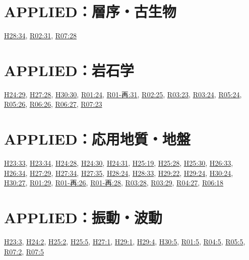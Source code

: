 \section{APPLIED：層序・古生物}
\hyperref[q:h28-reg-applied-34]{H28:34}, \hyperref[q:r02-reg-applied-31]{R02:31}, \hyperref[q:r07-reg-applied-28]{R07:28}
\section{APPLIED：岩石学}
\hyperref[q:h24-reg-applied-29]{H24:29}, \hyperref[q:h27-reg-applied-28]{H27:28}, \hyperref[q:h30-reg-applied-30]{H30:30}, \hyperref[q:r01-reg-applied-24]{R01:24}, \hyperref[q:r01-ret-applied-31]{R01-再:31}, \hyperref[q:r02-reg-applied-25]{R02:25}, \hyperref[q:r03-reg-applied-23]{R03:23}, \hyperref[q:r03-reg-applied-24]{R03:24}, \hyperref[q:r05-reg-applied-24]{R05:24}, \hyperref[q:r05-reg-applied-26]{R05:26}, \hyperref[q:r06-reg-applied-26]{R06:26}, \hyperref[q:r06-reg-applied-27]{R06:27}, \hyperref[q:r07-reg-applied-23]{R07:23}
\section{APPLIED：応用地質・地盤}
\hyperref[q:h23-reg-applied-33]{H23:33}, \hyperref[q:h23-reg-applied-34]{H23:34}, \hyperref[q:h24-reg-applied-28]{H24:28}, \hyperref[q:h24-reg-applied-30]{H24:30}, \hyperref[q:h24-reg-applied-31]{H24:31}, \hyperref[q:h25-reg-applied-19]{H25:19}, \hyperref[q:h25-reg-applied-28]{H25:28}, \hyperref[q:h25-reg-applied-30]{H25:30}, \hyperref[q:h26-reg-applied-33]{H26:33}, \hyperref[q:h26-reg-applied-34]{H26:34}, \hyperref[q:h27-reg-applied-29]{H27:29}, \hyperref[q:h27-reg-applied-34]{H27:34}, \hyperref[q:h27-reg-applied-35]{H27:35}, \hyperref[q:h28-reg-applied-24]{H28:24}, \hyperref[q:h28-reg-applied-33]{H28:33}, \hyperref[q:h29-reg-applied-22]{H29:22}, \hyperref[q:h29-reg-applied-24]{H29:24}, \hyperref[q:h30-reg-applied-24]{H30:24}, \hyperref[q:h30-reg-applied-27]{H30:27}, \hyperref[q:r01-reg-applied-29]{R01:29}, \hyperref[q:r01-ret-applied-26]{R01-再:26}, \hyperref[q:r01-ret-applied-28]{R01-再:28}, \hyperref[q:r03-reg-applied-28]{R03:28}, \hyperref[q:r03-reg-applied-29]{R03:29}, \hyperref[q:r04-reg-applied-27]{R04:27}, \hyperref[q:r06-reg-applied-18]{R06:18}
\section{APPLIED：振動・波動}
\hyperref[q:h23-reg-applied-03]{H23:3}, \hyperref[q:h24-reg-applied-02]{H24:2}, \hyperref[q:h25-reg-applied-02]{H25:2}, \hyperref[q:h25-reg-applied-05]{H25:5}, \hyperref[q:h27-reg-applied-01]{H27:1}, \hyperref[q:h29-reg-applied-01]{H29:1}, \hyperref[q:h29-reg-applied-04]{H29:4}, \hyperref[q:h30-reg-applied-05]{H30:5}, \hyperref[q:r01-reg-applied-05]{R01:5}, \hyperref[q:r04-reg-applied-05]{R04:5}, \hyperref[q:r05-reg-applied-05]{R05:5}, \hyperref[q:r07-reg-applied-02]{R07:2}, \hyperref[q:r07-reg-applied-05]{R07:5}
